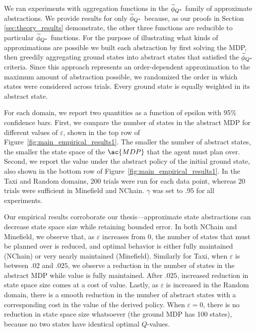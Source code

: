We ran experiments with aggregation functions in the $\widetilde \phi_{Q^*}$ family of approximate abstractions. We provide results for only $\widetilde \phi_{Q^*}$ because, as our proofs in Section \ref{sec:theory_results} demonstrate, the other three functions are reducible to particular $\widetilde \phi_{Q^*}$ functions. For the purpose of illustrating what kinds of approximations are possible we built each abstraction by first solving the MDP, then greedily aggregating ground states into abstract states that satisfied the $\widetilde \phi_{Q^*}$ criteria. Since this approach represents an order-dependent approximation to the maximum amount of abstraction possible, we randomized the order in which states were considered across trials. Every ground state is equally weighted in its abstract state.

For each domain, we report two quantities as a function of epsilon with 95\% confidence bars. First, we compare the number of states in the abstract \ac{MDP} for different values of $\varepsilon$, shown in the top row of Figure~\ref{fig:main_empirical_results1}. The smaller the number of abstract states, the smaller the state space of the $\ac{MDP}$ that the agent must plan over. Second, we report the value under the abstract policy of the initial ground state, also shown in the bottom row of Figure~\ref{fig:main_empirical_results1}. In the Taxi and Random domains, 200 trials were run for each data point, whereas 20 trials were sufficient in Minefield and NChain. $\gamma$ was set to $.95$ for all experiments.

Our empirical results corroborate our thesis---approximate state abstractions can decrease state space size while retaining bounded error. In both NChain and Minefield, we observe that, as $\varepsilon$ increases from $0$, the number of states that must be planned over is reduced, and optimal behavior is either fully maintained (NChain) or very nearly maintained (Minefield). Similarly for Taxi, when $\varepsilon$ is between $.02$ and $.025$, we observe a reduction in the number of states in the abstract \ac{MDP} while value is fully maintained. After $.025$, increased reduction in state space size comes at a cost of value. Lastly, as $\varepsilon$ is increased in the Random domain, there is a smooth reduction in the number of abstract states with a corresponding cost in the value of the derived policy. When $\varepsilon = 0$, there is no reduction in state space size whatsoever (the ground \ac{MDP} has 100 states), because no two states have identical optimal $Q$-values.

